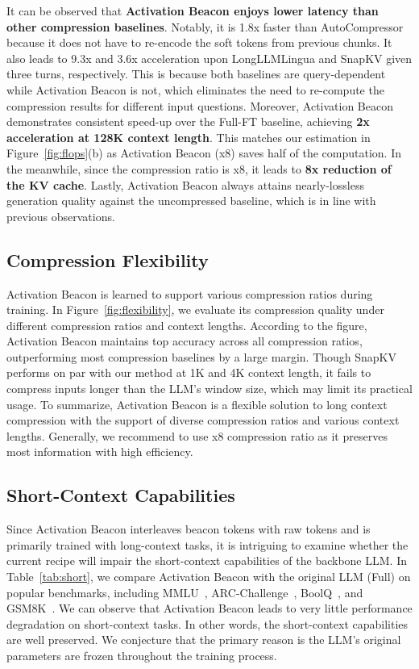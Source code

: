 It can be observed that \textbf{Activation Beacon enjoys lower latency than other compression baselines}. Notably, it is 1.8x faster than AutoCompressor because it does not have to re-encode the soft tokens from previous chunks. It also leads to 9.3x and 3.6x acceleration upon LongLLMLingua and SnapKV given three turns, respectively. This is because both baselines are query-dependent while Activation Beacon is not, which eliminates the need to re-compute the compression results for different input questions. Moreover, Activation Beacon demonstrates consistent speed-up over the Full-FT baseline, achieving \textbf{2x acceleration at 128K context length}. This matches our estimation in Figure~\ref{fig:flops}(b) as Activation Beacon (x8) saves half of the computation. In the meanwhile, since the compression ratio is x8, it leads to \textbf{8x reduction of the KV cache}. Lastly, Activation Beacon always attains nearly-lossless generation quality against the uncompressed baseline, which is in line with previous observations.

\subsection{Compression Flexibility}
\label{sec:exp-flexibility}

Activation Beacon is learned to support various compression ratios during training. In Figure~\ref{fig:flexibility}, we evaluate its compression quality under different compression ratios and context lengths. According to the figure, Activation Beacon maintains top accuracy across all compression ratios, outperforming most compression baselines by a large margin. Though SnapKV performs on par with our method at 1K and 4K context length, it fails to compress inputs longer than the LLM's window size, which may limit its practical usage. To summarize, Activation Beacon is a flexible solution to long context compression with the support of diverse compression ratios and various context lengths. Generally, we recommend to use x8 compression ratio as it preserves most information with high efficiency.

\subsection{Short-Context Capabilities}
\label{sec:exp-short}

Since Activation Beacon interleaves beacon tokens with raw tokens and is primarily trained with long-context tasks, it is intriguing to examine whether the current recipe will impair the short-context capabilities of the backbone LLM. In Table~\ref{tab:short}, we compare Activation Beacon with the original LLM (Full) on popular benchmarks, including MMLU~\citep{hendrycks2021mmlu}, ARC-Challenge~\citep{arc}, BoolQ~\citep{clark2019boolq}, and GSM8K~\citep{cobbe2021gsm8k}. We can observe that Activation Beacon leads to very little performance degradation on short-context tasks. In other words, the short-context capabilities are well preserved. We conjecture that the primary reason is the LLM's original parameters are frozen throughout the training process.

